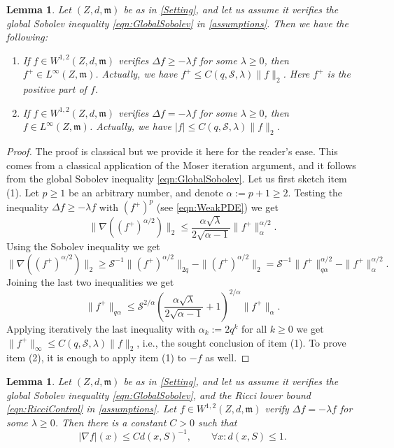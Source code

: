 \documentclass[12pt,a4paper,reqno]{amsart}
\newtheorem{lemma}[theorem]{Lemma}
\renewcommand{\leq}{\leqslant}
\renewcommand{\geq}{\geqslant}
\begin{document}
\begin{lemma}\label{lem:Step1}
    Let $(Z,d,\mathfrak{m})$ be as in \cref{Setting}, and let us assume it verifies the global Sobolev inequality \eqref{eqn:GlobalSobolev} in \cref{assumptions}. Then we have the following:
    \begin{enumerate}
        \item If $f\in W^{1,2}(Z,d,\mathfrak{m})$ verifies $\Delta f\geq -\lambda f$ for some $\lambda\geq 0$, then $f^+\in L^\infty(Z,\mathfrak{m})$. Actually, we have $f^+\leq C(q,\mathcal{S},\lambda)\|f\|_2$. Here $f^+$ is the positive part of $f$.
        \item If $f\in W^{1,2}(Z,d,\mathfrak{m})$ verifies $\Delta f = -\lambda f$ for some $\lambda\geq 0$, then $f\in L^\infty(Z,\mathfrak{m})$. Actually, we have $|f|\leq C(q,\mathcal{S},\lambda)\|f\|_2$.
    \end{enumerate}
\end{lemma}
\begin{proof}
    The proof is classical but we provide it here for the reader's ease. This comes from a classical application of the Moser iteration argument, and it follows from the global Sobolev inequality \eqref{eqn:GlobalSobolev}. Let us first sketch item (1). Let $p\geq 1$ be an arbitrary number, and denote $\alpha:=p+1\geq 2$. Testing the inequality $\Delta f\geq -\lambda f$ with $(f^+)^p$ (see \eqref{eqn:WeakPDE}) we get
    \begin{equation}\label{eqn:UpperEstimate}
    \|\nabla ((f^+)^{\alpha/2})\|_2 \leq \frac{\alpha\sqrt{\lambda}}{2\sqrt{\alpha-1}} \|f^+\|^{\alpha/2}_\alpha.
    \end{equation}
    Using the Sobolev inequality we get
    \[
    \|\nabla ((f^+)^{\alpha/2})\|_2 \geq \mathcal{S}^{-1}\|(f^+)^{\alpha/2}\|_{2q} - \|(f^+)^{\alpha/2}\|_{2} = \mathcal{S}^{-1}\|f^+\|_{q\alpha}^{\alpha/2} - \|f^+\|_{\alpha}^{\alpha/2}.
    \]
    Joining the last two inequalities we get 
    \[
    \|f^+\|_{q\alpha} \leq \mathcal{S}^{2/\alpha}\left(\frac{\alpha\sqrt{\lambda}}{2\sqrt{\alpha-1}}+1\right)^{2/\alpha}\|f^+\|_\alpha.
    \]
    Applying iteratively the last inequality with $\alpha_k:=2q^k$ for all $k\geq 0$ we get $\|f^+\|_\infty\leq C(q,\mathcal{S},\lambda)\|f\|_2$, i.e., the sought conclusion of item (1). To prove item (2), it is enough to apply item (1) to $-f$ as well.
\end{proof}
\begin{lemma}\label{lem:Step2}
    Let $(Z,d,\mathfrak{m})$ be as in \cref{Setting}, and let us assume it verifies the global Sobolev inequality \eqref{eqn:GlobalSobolev}, and the Ricci lower bound \eqref{eqn:RicciControl} in \cref{assumptions}. Let $f\in W^{1,2}(Z,d,\mathfrak{m})$ verify $\Delta f= -\lambda f$ for some $\lambda\geq 0$. Then there is a constant $C>0$ such that 
    \begin{equation}\label{eqn:GradEstimate}
        |\nabla f|(x)\leq C d(x,S)^{-1}, \qquad \forall x:d(x,S)\leq 1.
    \end{equation}
\end{lemma}
\end{document}
